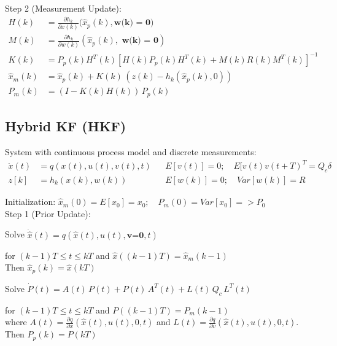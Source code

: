 \documentclass[landscape,a4paper,8pt]{scrartcl}
\begin{document}
\begin{multicols*}{3}
Step 2 (Measurement Update):
\begin{align*}
H(k) &= \frac{\partial h_k}{\partial x(k)} (\hat{x}_p(k), \textbf{w(k) = 0)} \\
M(k) &= \frac{\partial h_k}{\partial w(k)} (\hat{x}_p(k),\textbf{ w(k) = 0}) \\
K(k) &= P_p (k) H^T (k) [H(k) P_p(k) H^T(k) +  M(k) R(k) M^T(k)]^{-1} \\
\hat{x}_m (k) &= \hat{x}_p (k) + K(k) \, ( z(k) - h_k(\hat{x}_p (k), 0) ) \\
P_m (k) &= (I-K(k) H(k)) \, P_p(k) %
\end{align*}


\subsection{Hybrid KF (HKF)}

System with continuous process model and discrete measurements:
\begin{align*}
\dot{x}(t) &= q(x(t), u(t), v(t), t) & &E[v(t)]=0; \quad E[v(t) v(t+T)^T = Q_c \delta\\
z[k] &= h_k (x(k) , w(k)) & &E[w(k)]=0; \quad  Var[w(k)] = R
\end{align*}

Initialization: $\hat{x}_m(0)= E[x_0] = x_0; \quad P_m(0) = Var[x_0] = >P_0 $\\

Step 1 (Prior Update):
\begin{adjustwidth}{0.5cm}{}
Solve $\dot{\hat{x}}(t) = q(\hat{x}(t), u(t), \textbf{v=0}, t)$
\begin{adjustwidth}{0.0cm}{}
for $(k-1)T \leq t \leq k T$ and $\hat{x}((k-1)T) = \hat{x}_m(k-1)$ \\
Then $\hat{x}_p (k) = \hat{x}(kT)$ \\
\end{adjustwidth}

Solve $\dot{P}(t) = A(t) \, P(t) + P(t) \, A^T (t) + L(t) \, Q_c \, L^T (t)$ 
\begin{adjustwidth}{0.0cm}{}
for $(k-1) T \leq t \leq kT$ and $P((k-1)T) = P_m(k-1)$ \\
where $A(t) = \frac{\partial q}{\partial x}(\hat{x}(t), u(t), 0, t)$ and $L(t) = \frac{\partial q}{\partial v} ( \hat{x}(t), u(t), 0, t)$.  \\
Then $P_p(k) = P(kT)$ \\
\end{adjustwidth}
\end{adjustwidth}




\end{multicols*}
\end{document}
